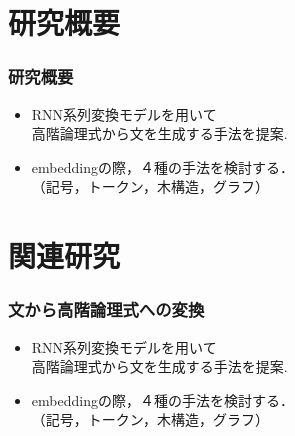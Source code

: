 \documentclass[dvipdfmx]{beamer}
\begin{document}
\section{研究概要}
\begin{frame}
\frametitle{研究概要}
\begin{center}
\end{center}

\begin{itemize}
  \item RNN系列変換モデルを用いて\\高階論理式から文を生成する手法を提案.
  \item embeddingの際，４種の手法を検討する．\\（記号，トークン，木構造，グラフ）　
\end{itemize}


\end{frame}


\section{関連研究}
\begin{frame}
\frametitle{文から高階論理式への変換}
\begin{center}
\end{center}

\begin{itemize}
  \item RNN系列変換モデルを用いて\\{\color{berry}高階論理式}から文を生成する手法を提案.
  \item embeddingの際，４種の手法を検討する．\\（記号，トークン，木構造，グラフ）　
\end{itemize}

\end{frame}
\end{document}
